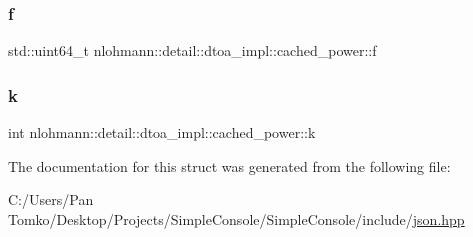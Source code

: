 \subsubsection{\texorpdfstring{f}{f}}
{\footnotesize\ttfamily std\+::uint64\+\_\+t nlohmann\+::detail\+::dtoa\+\_\+impl\+::cached\+\_\+power\+::f}

\mbox{\label{structnlohmann_1_1detail_1_1dtoa__impl_1_1cached__power_a8c1f2efed643eeaa8fae83c697a29c6a}} 
\subsubsection{\texorpdfstring{k}{k}}
{\footnotesize\ttfamily int nlohmann\+::detail\+::dtoa\+\_\+impl\+::cached\+\_\+power\+::k}



The documentation for this struct was generated from the following file\+:\begin{DoxyCompactItemize}
\item 
C\+:/\+Users/\+Pan Tomko/\+Desktop/\+Projects/\+Simple\+Console/\+Simple\+Console/include/\mbox{\hyperlink{json_8hpp}{json.\+hpp}}\end{DoxyCompactItemize}
